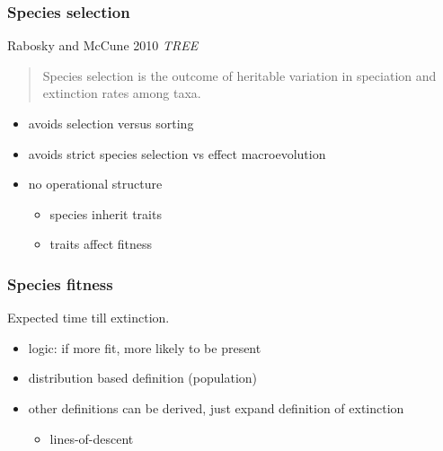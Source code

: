 \documentclass{beamer}
\begin{document}
\begin{frame}
  \frametitle{Species selection}

  \begin{block}{Rabosky and McCune 2010 \em{TREE}}
    \begin{quote}
      Species selection is the outcome of heritable variation in speciation and extinction rates among taxa.
    \end{quote}
  \end{block}

  \begin{itemize}
    \item avoids selection versus sorting
    \item avoids strict species selection vs effect macroevolution
    \item no operational structure
      \begin{itemize}
        \item species inherit traits
        \item traits affect fitness
      \end{itemize}
  \end{itemize}
\end{frame}

\begin{frame}
  \frametitle{Species fitness}

  \begin{definition}
    Expected time till extinction.
  \end{definition}
  
  \footnotesize{} 

  \begin{itemize}
    \item \alert{logic:} if more fit, more likely to be present
    \item distribution based definition (population)
    \item other definitions can be derived, just expand definition of extinction
      \begin{itemize}
        \item lines-of-descent 
      \end{itemize}
  \end{itemize}

\end{frame}

\begin{frame}
%  
\end{frame}
\end{document}
